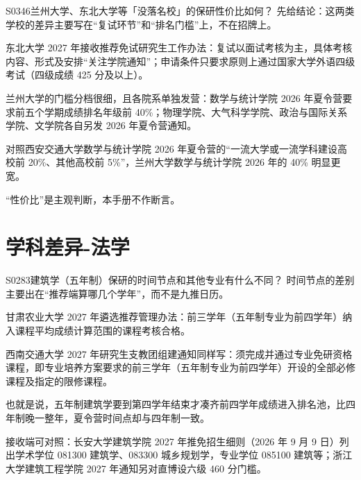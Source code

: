 \begin{qa}{S0346}{兰州大学、东北大学等「没落名校」的保研性价比如何？}
先给结论：这两类学校的差异主要写在“复试环节”和“排名门槛”上，不在招牌上。

东北大学 2027 年接收推荐免试研究生工作办法：复试以面试考核为主，具体考核内容、形式及安排“关注学院通知”；申请条件只要求原则上通过国家大学外语四级考试（四级成绩 425 分及以上）。

兰州大学的门槛分档很细，且各院系单独发营：数学与统计学院 2026 年夏令营要求前五个学期成绩排名年级前 40\%；物理学院、大气科学学院、政治与国际关系学院、文学院各自另发 2026 年夏令营通知。

对照西安交通大学数学与统计学院 2026 年夏令营的“一流大学或一流学科建设高校前 20\%、其他高校前 5\%”，兰州大学数学与统计学院 2026 年的 40\% 明显更宽。

“性价比”是主观判断，本手册不作断言。
\end{qa}

\section{学科差异-法学}
\begin{qa}{S0283}{建筑学（五年制）保研的时间节点和其他专业有什么不同？}
时间节点的差别主要出在“推荐端算哪几个学年”，而不是九推日历。

甘肃农业大学 2027 年遴选推荐管理办法：前三学年（五年制专业为前四学年）纳入课程平均成绩计算范围的课程考核合格。

西南交通大学 2027 年研究生支教团组建通知同样写：须完成并通过专业免研资格课程，即专业培养方案要求的前三学年（五年制专业为前四学年）开设的全部必修课程及指定的限修课程。

也就是说，五年制建筑学要到第四学年结束才凑齐前四学年成绩进入排名池，比四年制晚一整年，夏令营时间点却与四年制一致。

接收端可对照：长安大学建筑学院 2027 年推免招生细则（2026 年 9 月 9 日）列出学术学位 081300 建筑学、083300 城乡规划学，专业学位 085100 建筑等；浙江大学建筑工程学院 2027 年通知另对直博设六级 460 分门槛。
\end{qa}

